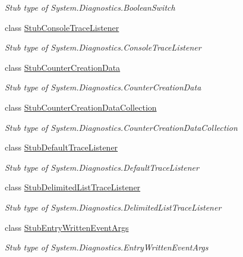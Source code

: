 \begin{DoxyCompactItemize}
\begin{DoxyCompactList}\small\item\em Stub type of System.\-Diagnostics.\-Boolean\-Switch\end{DoxyCompactList}\item 
class \hyperlink{class_system_1_1_diagnostics_1_1_fakes_1_1_stub_console_trace_listener}{Stub\-Console\-Trace\-Listener}
\begin{DoxyCompactList}\small\item\em Stub type of System.\-Diagnostics.\-Console\-Trace\-Listener\end{DoxyCompactList}\item 
class \hyperlink{class_system_1_1_diagnostics_1_1_fakes_1_1_stub_counter_creation_data}{Stub\-Counter\-Creation\-Data}
\begin{DoxyCompactList}\small\item\em Stub type of System.\-Diagnostics.\-Counter\-Creation\-Data\end{DoxyCompactList}\item 
class \hyperlink{class_system_1_1_diagnostics_1_1_fakes_1_1_stub_counter_creation_data_collection}{Stub\-Counter\-Creation\-Data\-Collection}
\begin{DoxyCompactList}\small\item\em Stub type of System.\-Diagnostics.\-Counter\-Creation\-Data\-Collection\end{DoxyCompactList}\item 
class \hyperlink{class_system_1_1_diagnostics_1_1_fakes_1_1_stub_default_trace_listener}{Stub\-Default\-Trace\-Listener}
\begin{DoxyCompactList}\small\item\em Stub type of System.\-Diagnostics.\-Default\-Trace\-Listener\end{DoxyCompactList}\item 
class \hyperlink{class_system_1_1_diagnostics_1_1_fakes_1_1_stub_delimited_list_trace_listener}{Stub\-Delimited\-List\-Trace\-Listener}
\begin{DoxyCompactList}\small\item\em Stub type of System.\-Diagnostics.\-Delimited\-List\-Trace\-Listener\end{DoxyCompactList}\item 
class \hyperlink{class_system_1_1_diagnostics_1_1_fakes_1_1_stub_entry_written_event_args}{Stub\-Entry\-Written\-Event\-Args}
\begin{DoxyCompactList}\small\item\em Stub type of System.\-Diagnostics.\-Entry\-Written\-Event\-Args\end{DoxyCompactList}\item 

\end{DoxyCompactItemize}
